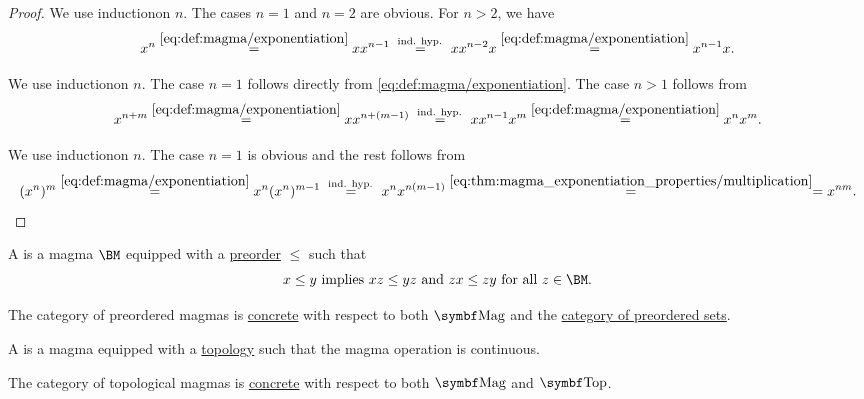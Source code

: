 \begin{proof}
   We use induction\IND on \( n \). The cases \( n = 1 \) and \( n = 2 \) are obvious. For \( n > 2 \), we have
  \begin{equation*}
    x^n
    \overset {\eqref{eq:def:magma/exponentiation}} =
    x x^{n-1}
    \overset {\text{ ind. hyp. }} =
    x x^{n-2} x
    \overset {\eqref{eq:def:magma/exponentiation}} =
    x^{n-1} x.
  \end{equation*}

   We use induction\LEM on \( n \). The case \( n = 1 \) follows directly from \eqref{eq:def:magma/exponentiation}. The case \( n > 1 \) follows from
  \begin{equation*}
    x^{n + m}
    \overset {\eqref{eq:def:magma/exponentiation}} =
    x x^{n + (m - 1)}
    \overset {\text{ ind. hyp. }} =
    x x^{n-1} x^m
    \overset {\eqref{eq:def:magma/exponentiation}} =
    x^n x^m.
  \end{equation*}

   We use induction\LEM on \( n \). The case \( n = 1 \) is obvious and the rest follows from
  \begin{equation*}
    (x^n)^m
    \overset {\eqref{eq:def:magma/exponentiation}} =
    x^n (x^n)^{m-1}
    \overset {\text{ ind. hyp. }} =
    x^n x^{n (m - 1)}
    \overset {\eqref{eq:thm:magma_exponentiation_properties/multiplication}} =
    =
    x^{nm}.
  \end{equation*}
\end{proof}

\begin{definition}\label{def:preordered_magma}
  A  is a magma \( \BM \) equipped with a \hyperref[def:preordered_set]{preorder} \( \leq \) such that
  \begin{equation}\label{eq:def:preordered_magma/compatibility}
    x \leq y \Timplies xz \leq yz \Tand zx \leq zy \Tforall z \in \BM.
  \end{equation}

  The category of preordered magmas is \hyperref[def:concrete_category]{concrete} with respect to both \( \Cat{Mag} \) and the \hyperref[def:magma/preordered]{category of preordered sets}.
\end{definition}

\begin{definition}\label{def:topological_magma}
  A  is a magma equipped with a \hyperref[def:topological_space]{topology} such that the magma operation is continuous.

  The category of topological magmas is \hyperref[def:concrete_category]{concrete} with respect to both \( \Cat{Mag} \) and \hyperref[def:category_of_topological_spaces]{\( \Cat{Top} \)}.
\end{definition}
